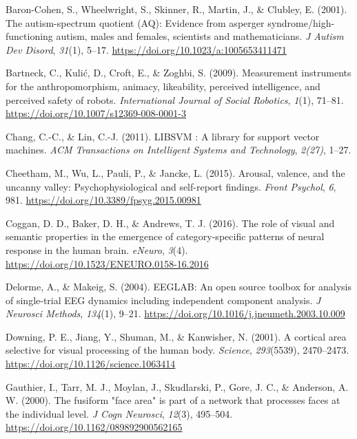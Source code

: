 \documentclass[
]{article}
\newlength{\cslhangindent}
\newenvironment{CSLReferences}[2] %
 {\begin{list}{}{%
  \setlength{\itemindent}{0pt}
  \setlength{\leftmargin}{0pt}
  \setlength{\parsep}{0pt}
  \ifodd #1
   \setlength{\leftmargin}{\cslhangindent}
   \setlength{\itemindent}{-1\cslhangindent}
  \fi
  \setlength{\itemsep}{#2\baselineskip}}}
 {\end{list}}
\begin{document}
\label{refs}
\begin{CSLReferences}{1}{0}
Baron-Cohen, S., Wheelwright, S., Skinner, R., Martin, J., \& Clubley, E. (2001). The autism-spectrum quotient (AQ): Evidence from asperger syndrome/high-functioning autism, males and females, scientists and mathematicians. \emph{J Autism Dev Disord}, \emph{31}(1), 5--17. \url{https://doi.org/10.1023/a:1005653411471}

Bartneck, C., Kulić, D., Croft, E., \& Zoghbi, S. (2009). Measurement instruments for the anthropomorphism, animacy, likeability, perceived intelligence, and perceived safety of robots. \emph{International Journal of Social Robotics}, \emph{1}(1), 71--81. \url{https://doi.org/10.1007/s12369-008-0001-3}

Chang, C.-C., \& Lin, C.-J. (2011). {LIBSVM} : A library for support vector machines. \emph{ACM Transactions on Intelligent Systems and Technology}, \emph{2(27)}, 1--27.

Cheetham, M., Wu, L., Pauli, P., \& Jancke, L. (2015). Arousal, valence, and the uncanny valley: Psychophysiological and self-report findings. \emph{Front Psychol}, \emph{6}, 981. \url{https://doi.org/10.3389/fpsyg.2015.00981}

Coggan, D. D., Baker, D. H., \& Andrews, T. J. (2016). The role of visual and semantic properties in the emergence of category-specific patterns of neural response in the human brain. \emph{eNeuro}, \emph{3}(4). \url{https://doi.org/10.1523/ENEURO.0158-16.2016}

Delorme, A., \& Makeig, S. (2004). {EEGLAB}: An open source toolbox for analysis of single-trial {EEG} dynamics including independent component analysis. \emph{J Neurosci Methods}, \emph{134}(1), 9--21. \url{https://doi.org/10.1016/j.jneumeth.2003.10.009}

Downing, P. E., Jiang, Y., Shuman, M., \& Kanwisher, N. (2001). A cortical area selective for visual processing of the human body. \emph{Science}, \emph{293}(5539), 2470--2473. \url{https://doi.org/10.1126/science.1063414}

Gauthier, I., Tarr, M. J., Moylan, J., Skudlarski, P., Gore, J. C., \& Anderson, A. W. (2000). The fusiform "face area" is part of a network that processes faces at the individual level. \emph{J Cogn Neurosci}, \emph{12}(3), 495--504. \url{https://doi.org/10.1162/089892900562165}


\end{CSLReferences}
\end{document}
